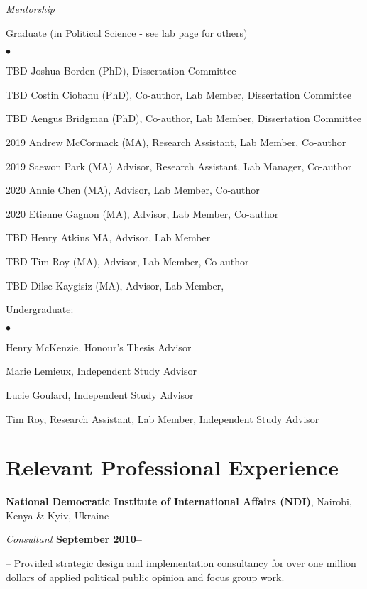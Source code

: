 \documentclass[margin,line]{res}
\newenvironment{list1}{
  \begin{list}{\ding{113}}{%
      \setlength{\itemsep}{0in}
      \setlength{\parsep}{0in} \setlength{\parskip}{0in}
      \setlength{\topsep}{0in} \setlength{\partopsep}{0in} 
      \setlength{\leftmargin}{0.17in}}}{\end{list}}
\newenvironment{list2}{
  \begin{list}{$\bullet$}{%
      \setlength{\itemsep}{0in}
      \setlength{\parsep}{0in} \setlength{\parskip}{0in}
      \setlength{\topsep}{0in} \setlength{\partopsep}{0in} 
      \setlength{\leftmargin}{0.2in}}}{\end{list}}
\begin{document}
{\begin{resume}
\textbf{}
{\em Mentorship}\\
\vspace{-.1in}
\begin{list1}
\item[] Graduate (in Political Science - see lab page for others)
  \begin{list2}
  \item[TBD] Joshua Borden (PhD), Dissertation Committee
  \item[TBD] Costin Ciobanu (PhD), Co-author, Lab Member, Dissertation Committee
  \item[TBD] Aengus Bridgman (PhD), Co-author, Lab Member, Dissertation Committee
   \item[2019] Andrew McCormack (MA), Research Assistant, Lab Member, Co-author
   \item[2019] Saewon Park (MA) Advisor, Research Assistant, Lab Manager, Co-author
   \item[2020] Annie Chen (MA), Advisor, Lab Member, Co-author
  \item[2020] Etienne Gagnon (MA), Advisor, Lab Member, Co-author
   \item[TBD] Henry Atkins MA, Advisor, Lab Member
   \item[TBD] Tim Roy (MA), Advisor, Lab Member, Co-author
     \item[TBD] Dilse Kaygisiz (MA), Advisor, Lab Member, 

\end{list2}

 \item[] Undergraduate:
   \begin{list2}
   \item[] Henry McKenzie, Honour's Thesis Advisor
   \item[] Marie Lemieux, Independent Study Advisor
    \item[] Lucie Goulard, Independent Study Advisor
   \item[] Tim Roy, Research Assistant, Lab Member, Independent Study Advisor
\end{list2}
\end{list1}

\section{\sc Relevant Professional Experience}
{\bf National Democratic Institute of International Affairs (NDI)},
Nairobi, Kenya \& Kyiv, Ukraine

\vspace{-.3cm}
{\em Consultant} \hfill {\bf
  September 2010--}\\
\begin{list1}
\item[]-- Provided strategic design and implementation consultancy
  for over one million dollars of applied
political public opinion and focus group work.
\end{list1}


\end{resume}}
\end{document}
